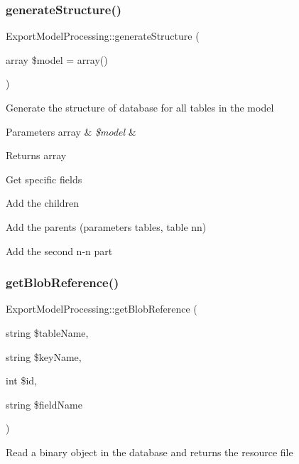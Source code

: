 \subsubsection{\texorpdfstring{generate\+Structure()}{generateStructure()}}
{\footnotesize\ttfamily Export\+Model\+Processing\+::generate\+Structure (\begin{DoxyParamCaption}\item[{array}]{\$model = {\ttfamily array()} }\end{DoxyParamCaption})}

Generate the structure of database for all tables in the model


\begin{DoxyParams}[1]{Parameters}
array & {\em \$model} & \\
\hline
\end{DoxyParams}
\begin{DoxyReturn}{Returns}
array 
\end{DoxyReturn}
Get specific fields

Add the children

Add the parents (parameters tables, table nn)

Add the second n-\/n part\mbox{\label{classExportModelProcessing_a35cfd1e3beb5e7dc9a47d8cc262b2c93}} 
\subsubsection{\texorpdfstring{get\+Blob\+Reference()}{getBlobReference()}}
{\footnotesize\ttfamily Export\+Model\+Processing\+::get\+Blob\+Reference (\begin{DoxyParamCaption}\item[{string}]{\$table\+Name,  }\item[{string}]{\$key\+Name,  }\item[{int}]{\$id,  }\item[{string}]{\$field\+Name }\end{DoxyParamCaption})}

Read a binary object in the database and returns the resource file


